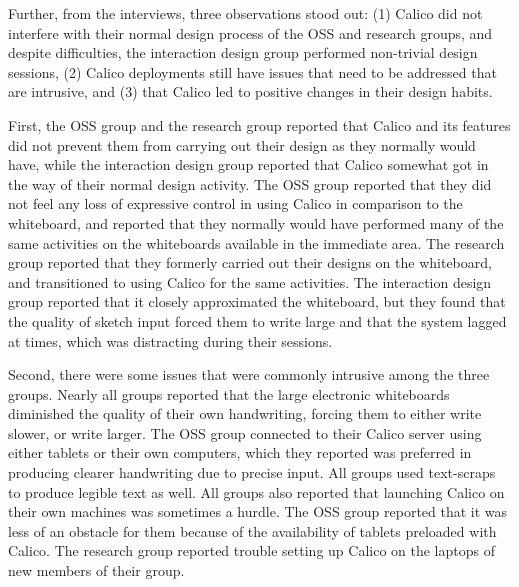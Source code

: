 Further, from the interviews, three observations stood out: (1) Calico did not interfere with their normal design process of the OSS and research groups, and despite difficulties, the interaction design group performed non-trivial design sessions, (2) Calico deployments still have issues that need to be addressed that are intrusive, and (3) that Calico led to positive changes in their design habits.

First, the OSS group and the research group reported that Calico and its features did not prevent them from carrying out their design as they normally would have, while the interaction design group reported that Calico somewhat got in the way of their normal design activity. The OSS group reported that they did not feel any loss of expressive control in using Calico in comparison to the whiteboard, and reported that they normally would have performed many of the same activities on the whiteboards available in the immediate area. The research group reported that they formerly carried out their designs on the whiteboard, and transitioned to using Calico for the same activities. The interaction design group reported that it closely approximated the whiteboard, but they found that the quality of sketch input forced them to write large and that the system lagged at times, which was distracting during their sessions.


Second, there were some issues that were commonly intrusive among the three groups. Nearly all groups reported that the large electronic whiteboards diminished the quality of their own handwriting, forcing them to either write slower, or write larger. The OSS group connected to their Calico server using either tablets or their own computers, which they reported was preferred in producing clearer handwriting due to precise input. All groups used text-scraps to produce legible text as well. All groups also reported that launching Calico on their own machines was sometimes a hurdle. The OSS group reported that it was less of an obstacle for them because of the availability of tablets preloaded with Calico. The research group reported trouble setting up Calico on the laptops of new members of their group.


